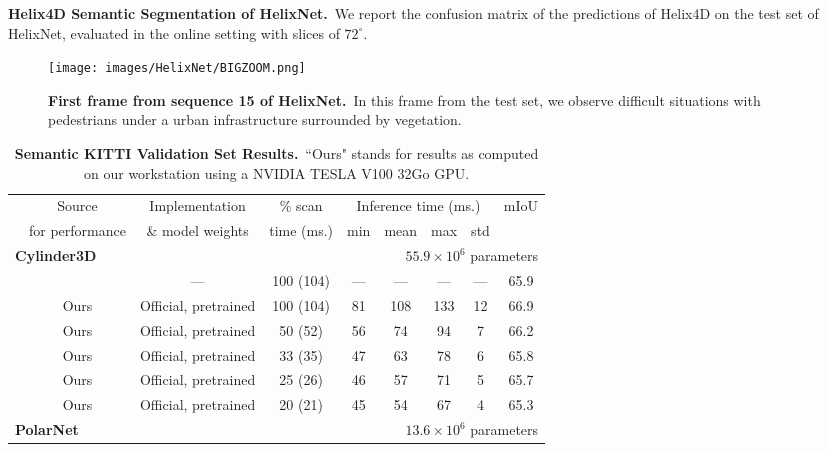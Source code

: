 \documentclass[runningheads]{tpls/llncs}
\begin{document}
\begin{table}[t]
\vspace{.5em}     \caption{\textbf{Helix4D Semantic Segmentation of HelixNet.}~We report the confusion matrix of the predictions of Helix4D on the test set of HelixNet, evaluated in the online setting with slices of $72^\circ$.}
    \label{tab:confmat}
\end{table}

\begin{figure}
    \centering
    \texttt{[image: images/HelixNet/BIGZOOM.png]}
    \caption{\textbf{First frame from sequence 15 of HelixNet.}~In this frame from the test set, we observe difficult situations with pedestrians under a urban infrastructure surrounded by vegetation.}
    \label{fig:bigzoom}
\end{figure}

\begin{table*}[t]
    \centering
    \caption{\textbf{Semantic KITTI Validation Set Results.}~``Ours" stands for results as computed on our workstation using a NVIDIA TESLA V100 32Go GPU.}
    \label{tab:detailed}
    \renewcommand{\arraystretch}{1.25}
    \begin{tabular*}{\textwidth}{@{}l@{\extracolsep{\fill}}*{8}{c}@{}}
        \toprule
         & \multirow{1}{*}{Source} & Implementation & {\% scan} & \multicolumn{4}{c}{Inference time (ms.)} & \multirow{2}{*}{mIoU}\\
         & for performance& \& model weights & {time (ms.)} & min & mean & max & std & \\
        \midrule
        \multicolumn{4}{l}{\textbf{Cylinder3D~\cite{zhu2021cylindrical}}} & & \multicolumn{4}{r}{\scriptsize $55.9\times 10^6$ parameters} \\
        & \cite{zhu2021cylindrical} & --- & 100 (104) & ---  & --- & --- & ---   & 65.9 \\
        & Ours    & Official, pretrained & 100 (104) & 81 & 108 & 133 & 12 & 66.9  \\
        & Ours    & Official, pretrained & 50 (52)   & 56 & 74  & 94  & 7  & 66.2  \\
        & Ours    & Official, pretrained & 33 (35)   & 47 & 63  & 78  & 6  & 65.8  \\
        & Ours    & Official, pretrained & 25 (26)   & 46 & 57  & 71  & 5  & 65.7  \\
        & Ours    & Official, pretrained & 20 (21)   & 45 & 54  & 67  & 4  & 65.3  \\
        \midrule
        \multicolumn{4}{l}{\textbf{PolarNet~\cite{Zhang_2020_CVPR}}} & & \multicolumn{4}{r}{\scriptsize $13.6\times 10^6$ parameters} \\

\end{tabular*}
\end{table*}
\end{document}
